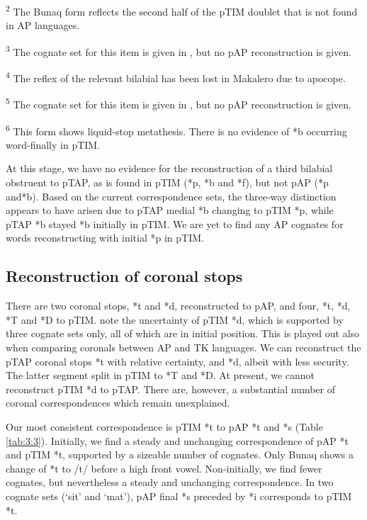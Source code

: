 \begin{table}
\textsuperscript{2} The Bunaq form reflects the second half of the pTIM doublet that is not found in AP languages.

\textsuperscript{3} The cognate set for this item is given in \citet{HoltonEtAl2012}, but no pAP reconstruction is given.

\textsuperscript{4} The reflex of the relevant bilabial has been lost in Makalero due to apocope.

\textsuperscript{5} The cognate set for this item is given in \citet{HoltonEtAl2012}, but no pAP reconstruction is given.

\textsuperscript{6} This form shows liquid-stop metathesis. There is no evidence of *b occurring word-finally in pTIM.
\end{table}



At this stage, we have no evidence for the reconstruction of a third bilabial obstruent to pTAP, as is found in pTIM (*p, *b and *f), but not pAP (*p and*b). Based on the current correspondence sets, the three-way distinction appears to have arisen due to pTAP medial *b changing to pTIM *p, while pTAP *b stayed *b initially in pTIM. We are yet to find any AP cognates for words reconstructing with initial *p in pTIM.

\subsection{Reconstruction of coronal stops}
There are two coronal stops, *t and *d, reconstructed to pAP, and four, *t, *d, *T and *D to pTIM. \citet{SchapperEtAl2012} note the uncertainty of pTIM *d, which is supported by three cognate sets only, all of which are in initial position. This is played out also when comparing coronals between AP and TK languages. We can reconstruct the pTAP coronal stops *t with relative certainty, and *d, albeit with less security. The latter segment split in pTIM to *T and *D. At present, we cannot reconstruct pTIM *d to pTAP. There are, however, a substantial number of coronal correspondences which remain unexplained. 

Our most consistent correspondence is pTIM *t to pAP *t and *s (Table \ref{tab:3:3}). Initially, we find a steady and unchanging correspondence of pAP *t and pTIM *t, supported by a sizeable number of cognates. Only Bunaq shows a change of *t to /t{\textesh}/ before a high front vowel. Non-initially, we find fewer cognates, but nevertheless a steady and unchanging correspondence. In two cognate sets (`sit' and `mat'), pAP final *s preceded by *i corresponds to pTIM *t.
 

